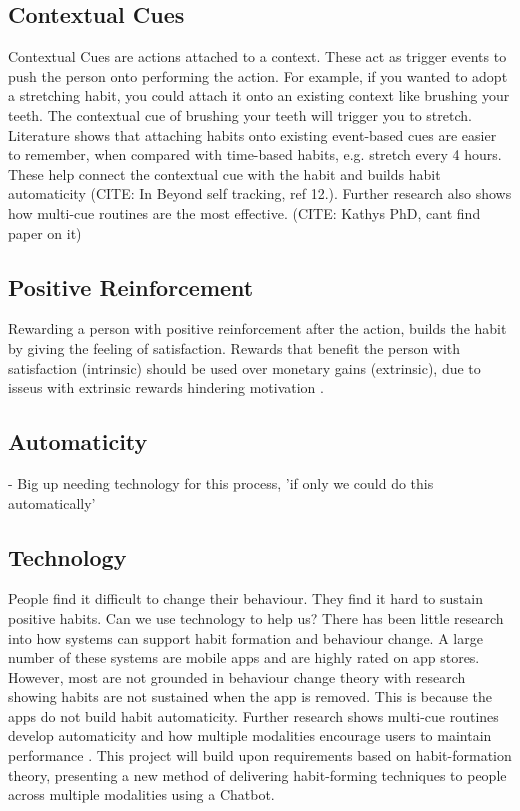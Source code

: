 \subsection*{Contextual Cues}
Contextual Cues are actions attached to a context. These act as trigger events to push the person onto performing the action. For example, if you wanted to adopt a stretching habit, you could attach it onto an existing context like brushing your teeth. The contextual cue of brushing your teeth will trigger you to stretch. Literature \cite{article_beyond_self_tracking_designing_apps} shows that attaching habits onto existing event-based cues are easier to remember, when compared with time-based habits, e.g. stretch every 4 hours. These help connect the contextual cue with the habit and builds habit automaticity (CITE: In Beyond self tracking, ref 12.). Further research also shows how multi-cue routines are the most effective. (CITE: Kathys PhD, cant find paper on it)

\subsection*{Positive Reinforcement}
Rewarding a person with positive reinforcement after the action, builds the habit by giving the feeling of satisfaction. Rewards that benefit the person with satisfaction (intrinsic) should be used over monetary gains (extrinsic), due to isseus with extrinsic rewards hindering motivation \cite{article_beyond_self_tracking_designing_apps}.

\subsection*{Automaticity}
- Big up needing technology for this process, 'if only we could do this automatically'

\subsection{Technology}

People find it difficult to change their behaviour. They find it hard to sustain positive habits. Can we use technology to help us?\newline
\newline
There has been little research into how systems can support habit formation and behaviour change. A large number of these systems are mobile apps and are highly rated on app stores. However, most are not grounded in behaviour change theory with research showing habits are not sustained when the app is removed. This is because the apps do not build habit automaticity. Further research shows multi-cue routines develop automaticity and how multiple modalities encourage users to maintain performance \cite{article_realtime_feedback_improving_medication_taking}.\newline
\newline
This project will build upon requirements based on habit-formation theory, presenting a new method of delivering habit-forming techniques to people across multiple modalities using a Chatbot.



